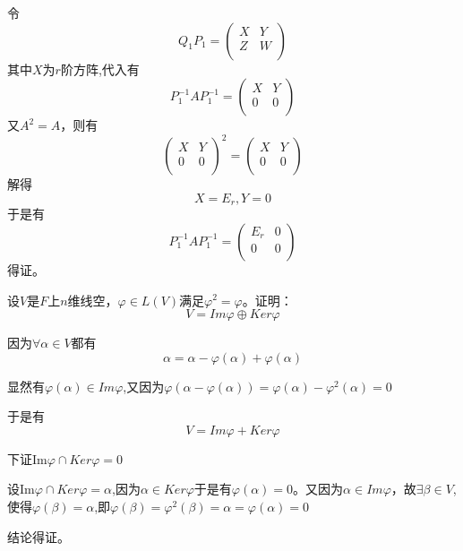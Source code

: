 \documentclass[lang=cn,10pt]{elegantbook}
\begin{document}
	令
	\begin{equation*}
		Q_{1}P_{1}=\left( \begin{matrix}
			X&		Y\\
			Z&		W\\
		\end{matrix} \right) 
	\end{equation*}
	其中$X$为$r$阶方阵,代入有
	\begin{equation*}
		P_{1}^{-1}AP_{1}^{-1}=\left( \begin{matrix}
			X&		Y\\
			0&		0\\
		\end{matrix} \right)
	\end{equation*}
	又$A^{2}=A$，则有
	\begin{equation*}
		\left( \begin{matrix}
			X&		Y\\
			0&		0\\
		\end{matrix} \right)^{2}=\left( \begin{matrix}
		X&		Y\\
		0&		0\\
		\end{matrix} \right)
	\end{equation*}
	解得
	\begin{equation*}
		X=E_{r},Y=0
	\end{equation*}
	于是有
	\begin{equation*}
		P_{1}^{-1}AP_{1}^{-1}=\left( \begin{matrix}
			E_{r}&		0\\
			0&		0\\
		\end{matrix} \right)
	\end{equation*}
	得证。
\begin{example}
	设$V$是$F$上$n$维线空$，\varphi\in L(V)$满足$\varphi^2=\varphi$。证明：
	\begin{equation*}
		V=Im{\varphi}\oplus Ker\varphi
	\end{equation*}
\end{example}
\begin{solution}
	
	因为$\forall \alpha \in V$都有
	\begin{equation*}
		\alpha=\alpha-\varphi(\alpha)+\varphi(\alpha)
	\end{equation*}
	
	显然有$\varphi(\alpha) \in Im\varphi$,又因为$\varphi(\alpha-\varphi(\alpha))=\varphi(\alpha)-\varphi^{2}(\alpha)=0$
	
	于是有
	\begin{equation*}
		V=Im{\varphi}+ Ker\varphi
	\end{equation*}
	
	下证$\mathrm{Im}\varphi \cap Ker\varphi =0$
	
	设$\mathrm{Im}\varphi \cap Ker\varphi =\alpha$,因为$\alpha\in Ker\varphi$于是有$\varphi(\alpha)=0$。又因为$\alpha\in Im\varphi$，故$\exists \beta \in V$,使得$\varphi(\beta)=\alpha $,即$\varphi(\beta)=\varphi^{2}(\beta)=\alpha=\varphi(\alpha)=0$
	
	结论得证。
	
\end{solution}
\end{document}
